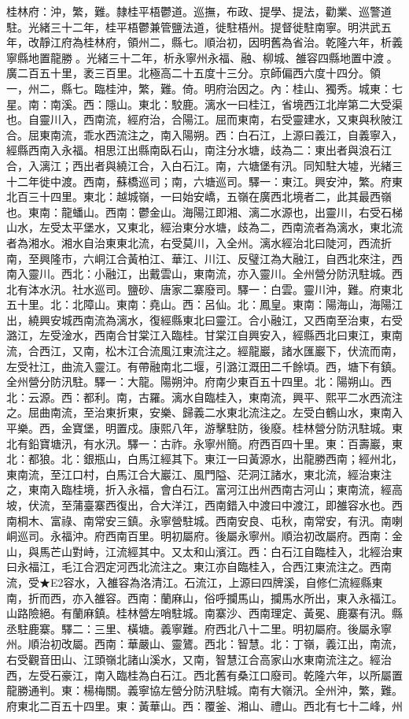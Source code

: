 \begin{pinyinscope}
桂林府：沖，繁，難。隸桂平梧鬱道。巡撫，布政、提學、提法，勸業、巡警道駐。光緒三十二年，桂平梧鬱兼管鹽法道，徙駐梧州。提督徙駐南寧。明洪武五年，改靜江府為桂林府，領州二，縣七。順治初，因明舊為省治。乾隆六年，析義寧縣地置龍勝。光緒三十二年，析永寧州永福、融、柳城、雒容四縣地置中渡。廣二百五十里，袤三百里。北極高二十五度十三分。京師偏西六度十四分。領一，州二，縣七。臨桂沖，繁，難。倚。明府治因之。內：桂山、獨秀。城東：七星。南：南溪。西：隱山。東北：駮鹿。漓水一曰桂江，省境西江北岸第二大受渠也。自靈川入，西南流，經府治，合陽江。屈而東南，右受靈建水，又東與秋陂江合。屈東南流，乖水西流注之，南入陽朔。西：白石江，上源曰義江，自義寧入，經縣西南入永福。相思江出縣南臥石山，南注分水塘，歧為二：東出者與浪石江合，入漓江；西出者與繞江合，入白石江。南，六塘堡有汛。同知駐大墟，光緒三十二年徙中渡。西南，蘇橋巡司；南，六塘巡司。驛一：東江。興安沖，繁。府東北百三十四里。東北：越城嶺，一曰始安嶠，五嶺在廣西北境者二，此其最西嶺也。東南：龍蟠山。西南：鬱金山。海陽江即湘、漓二水源也，出靈川，右受石梯山水，左受太平堡水，又東北，經治東分水塘，歧為二，西南流者為漓水，東北流者為湘水。湘水自治東東北流，右受莫川，入全州。漓水經治北曰陡河，西流折南，至興隆市，六峒江合黃柏江、華江、川江、反璧江為大融江，自西北來注，西南入靈川。西北：小融江，出戴雲山，東南流，亦入靈川。全州營分防汛駐城。西北有泍水汛。社水巡司。鹽砂、唐家二寨廢司。驛一：白雲。靈川沖，難。府東北五十里。北：北障山。東南：堯山。西：呂仙。北：鳳皇。東南：陽海山，海陽江出，繞興安城西南流為漓水，復經縣東北曰靈江。合小融江，又西南至治東，右受潞江，左受淦水，西南合甘棠江入臨桂。甘棠江自興安入，經縣西北曰東江，東南流，合西江，又南，松木江合流風江東流注之。經龍巖，諸水匯巖下，伏流而南，左受社江，曲流入靈江。有帶融南北二堰，引潞江溉田二千餘頃。西，塘下有鎮。全州營分防汛駐。驛一：大龍。陽朔沖。府南少東百五十四里。北：陽朔山。西北：云源。西：都利。南，古羅。漓水自臨桂入，東南流，興平、熙平二水西流注之。屈曲南流，至治東折東，安樂、歸義二水東北流注之。左受白鶴山水，東南入平樂。西，金寶堡，明置戍。康熙八年，游擊駐防，後廢。桂林營分防汛駐城。東北有鉛寶塘汛，有水汛。驛一：古祚。永寧州簡。府西百四十里。東：百壽巖，東北：都狼。北：銀瓶山，白馬江經其下。東江一曰黃源水，出龍勝西南；經州北，東南流，至江口村，白馬江合大巖江、風門隘、茫洞江諸水，東北流，經治東注之，東南入臨桂境，折入永福，會白石江。富河江出州西南古河山；東南流，經高坡，伏流，至蒲臺寨西復出，合大洋江，西南錯入中渡曰中渡江，即雒容水也。西南桐木、富祿、南常安三鎮。永寧營駐城。西南安良、屯秋，南常安，有汛。南喇峒巡司。永福沖。府西南百里。明初屬府。後屬永寧州。順治初改屬府。西南：金山，與馬芒山對峙，江流經其中。又太和山濱江。西：白石江自臨桂入，北經治東曰永福江，毛江合泗定河西北流注之。東江亦自臨桂入，合西江東流注之。西南流，受★E2容水，入雒容為洛清江。石流江，上源曰四牌溪，自修仁流經縣東南，折而西，亦入雒容。西南：蘭麻山，俗呼攔馬山，攔馬水所出，東入永福江。山路險絕。有蘭麻鎮。桂林營左哨駐城。南寨沙、西南理定、黃冕、鹿寨有汛。縣丞駐鹿寨。驛二：三里、橫塘。義寧難。府西北八十二里。明初屬府。後屬永寧州。順治初改屬。西南：華嚴山、靈鷟。西北：智慧。北：丁嶺，義江出，南流，右受觀音田山、江頭嶺北諸山溪水，又南，智慧江合高家山水東南流注之。經治西，左受石豪江，南入臨桂為白石江。西北舊有桑江口廢司。乾隆六年，以所屬置龍勝通判。東：楊梅關。義寧協左營分防汛駐城。南有大嶺汛。全州沖，繁，難。府東北二百五十四里。東：黃華山。西：覆釜、湘山、禮山。西北有七十二峰，州
\end{pinyinscope}
